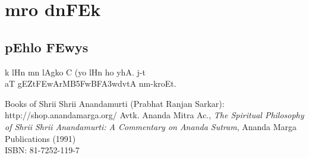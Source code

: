 \documentclass[12pt]{book}
\begin{document}
\chapter{ {\dn m\?ro d\4nFEk}}
\section{{\dn pEhlo \3FEwys}}
{\dn 
\vfill{}
k\? l\?Hn mn lAg\?ko C (yo l\?Hn\? ho yhA. j-t\4 
}
\\
{\dn aT gEZt\3FEwArMB\?\35FwBF\3A3wd\?vtA\2 nm-kroEt.}
\backmatter
%
\begin{thebibliography}{99}
Books of Shrii Shrii Anandamurti (Prabhat Ranjan Sarkar): \\
http://shop.anandamarga.org/
Avtk. Ananda Mitra Ac., \emph{The Spiritual Philosophy of Shrii Shrii Anandamurti: A Commentary on Ananda Sutram}, Ananda Marga Publications (1991) \\
ISBN: 81-7252-119-7
\end{thebibliography}
\end{document}
